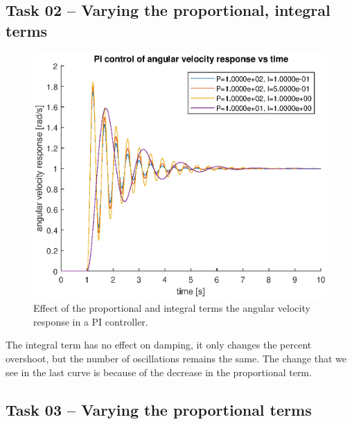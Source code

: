 \documentclass[12pt]{article}
\begin{document}
\subsection{Task 02 -- Varying the proportional, integral terms}

\begin{figure}
    \centering
    \includegraphics[width=\linewidth]{img/task02_varying_pi.eps}
    \caption{Effect of the proportional and integral terms the angular velocity response in a PI controller.}
    \label{fig:pi on angular velocity}
\end{figure}

The integral term has no effect on damping, it only changes the percent overshoot, but the number of oscillations remains the same. The change that we see in the last curve is because of the decrease in the proportional term.

\subsection{Task 03 -- Varying the proportional terms}
\end{document}
